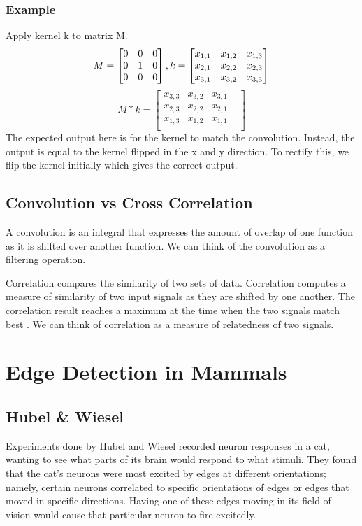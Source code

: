 \documentclass{article}
\begin{document}
\subsubsection{Example}
Apply kernel k to matrix M. 
$$ M = \begin{bmatrix} 
0 & 0 & 0\\ 
0 & 1 & 0\\
0 & 0 & 0
\end{bmatrix}, \\
k = \begin{bmatrix}
x_{1,1} & x_{1,2} & x_{1,3} \\
x_{2,1} & x_{2,2} & x_{2,3}\\
x_{3,1} & x_{3,2} & x_{3,3}\\
\end{bmatrix}$$
$$ M * k = \begin{bmatrix}
x_{3,3} & x_{3,2} & x_{3,1} &\\
x_{2,3} & x_{2,2} & x_{2,1} &\\
x_{1,3} & x_{1,2} & x_{1,1} &\\
\end{bmatrix}$$
The expected output here is for the kernel to match the convolution. Instead, the output is equal to the kernel flipped in the x and y direction. To rectify this, we flip the kernel initially which gives the correct output. 
\subsection{Convolution vs Cross Correlation}
A convolution is an integral that expresses the amount of overlap of one function as it is shifted over another function. We can think of the convolution as a filtering operation. \newline

Correlation compares the similarity of two sets of data. Correlation computes a measure of similarity of two input signals as they are shifted by one another. The correlation result reaches a maximum at the time when the two signals match best . We can think of correlation as a measure of relatedness of two signals.

\section{Edge Detection in Mammals}

\subsection{Hubel \& Wiesel}
Experiments done by Hubel and Wiesel recorded neuron responses in a cat, wanting to see what
parts of its brain would respond to what stimuli. They found that the cat’s neurons were most excited by edges at different orientations; namely, certain neurons correlated to specific orientations of edges or edges that moved in specific directions. Having one of these edges moving in its field of vision would cause that particular neuron to fire excitedly.
\end{document}
